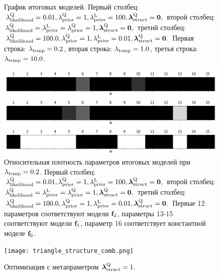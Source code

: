 \begin{figure}
\caption{График итоговых моделей.
Первый столбец: $\lamLL = 0.01, \lamCQ = 1, \lamCL = 100, \lamS = \mathbf{0},$  второй столбец: $\lamLL = \lamCL = \lamCQ = 1, \lamS = \mathbf{0},$ 
третий столбец: $\lamLL = 100.0, \lamCQ = 1, \lamCL = 0.01, \lamS = \mathbf{0}.$ 
Первая строка: $\lamT = 0.2$, вторая строка: $\lamT = 1.0$, третья строка: $\lamT = 10.0$.}
\label{fig:fig_plot_synthetic_results}
\end{figure}



\begin{figure}
 \begin{minipage}[]{.3\textwidth}
    \includegraphics[width=\textwidth]{bar_0_2kld.png}
\subcaption{}
\end{minipage}
 \begin{minipage}{.3\textwidth}
    \includegraphics[width=\textwidth]{bar_0_2elbo.png}
\subcaption{}
\end{minipage}
 \begin{minipage}{.3\textwidth}
    \includegraphics[width=\textwidth]{bar_0_2overfit.png}
\subcaption{}
\end{minipage}


\caption{Относительная плотность параметров итоговых моделей при $\lamT = 0.2$.
Первый столбец: $\lamLL = 0.01, \lamCQ = 1, \lamCL = 100, \lamS = \mathbf{0},$  второй столбец: $\lamLL = \lamCL = \lamCQ = 1, \lamS = \mathbf{0},$ 
третий столбец: $\lamLL = 100.0, \lamCQ = 1, \lamCL = 0.01, \lamS = \mathbf{0}.$ Первые 12 параметров соответствуют модели $\model_2$, параметры 13-15 соответствуют модели $\model_1$, параметр 16 соответствует константной моделе $\model_0$.}
\label{fig:bar_rho}
\end{figure}




\begin{figure}
\texttt{[image: triangle\_structure\_comb.png]}
\caption{Оптимизация с метапраметром $\lamS=1.$}
\label{fig:structure_comb_example}
\end{figure}